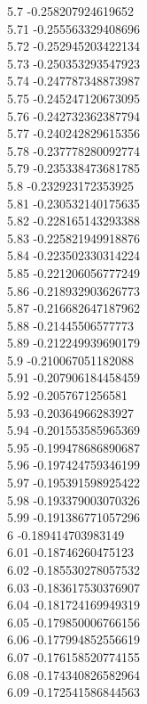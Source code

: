 {5.7	-0.258207924619652\\
5.71	-0.255563329408696\\
5.72	-0.252945203422134\\
5.73	-0.250353293547923\\
5.74	-0.247787348873987\\
5.75	-0.245247120673095\\
5.76	-0.242732362387794\\
5.77	-0.240242829615356\\
5.78	-0.237778280092774\\
5.79	-0.235338473681785\\
5.8	-0.232923172353925\\
5.81	-0.230532140175635\\
5.82	-0.228165143293388\\
5.83	-0.225821949918876\\
5.84	-0.223502330314224\\
5.85	-0.221206056777249\\
5.86	-0.218932903626773\\
5.87	-0.216682647187962\\
5.88	-0.21445506577773\\
5.89	-0.212249939690179\\
5.9	-0.210067051182088\\
5.91	-0.207906184458459\\
5.92	-0.2057671256581\\
5.93	-0.20364966283927\\
5.94	-0.201553585965369\\
5.95	-0.199478686890687\\
5.96	-0.197424759346199\\
5.97	-0.195391598925422\\
5.98	-0.193379003070326\\
5.99	-0.191386771057296\\
6	-0.189414703983149\\
6.01	-0.18746260475123\\
6.02	-0.185530278057532\\
6.03	-0.183617530376907\\
6.04	-0.181724169949319\\
6.05	-0.179850006766156\\
6.06	-0.177994852556619\\
6.07	-0.176158520774155\\
6.08	-0.174340826582964\\
6.09	-0.172541586844563\\
}

